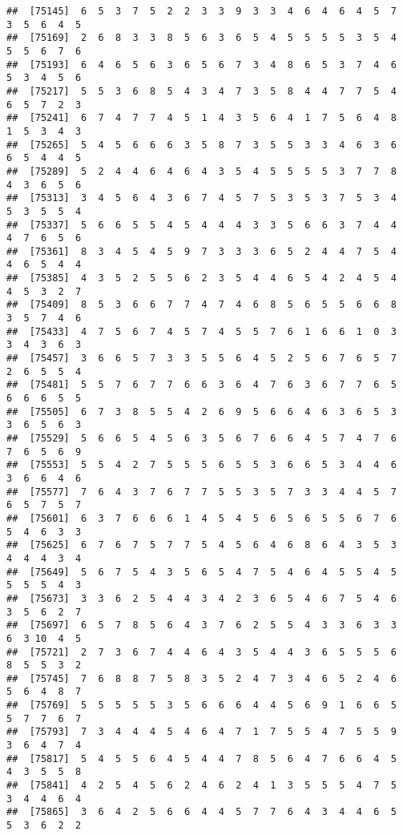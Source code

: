 \documentclass[
]{book}
\begin{document}
\begin{verbatim}
##  [75145]  6  5  3  7  5  2  2  3  3  9  3  3  4  6  4  6  4  5  7  3  5  6  4  5
##  [75169]  2  6  8  3  3  8  5  6  3  6  5  4  5  5  5  5  3  5  4  5  5  6  7  6
##  [75193]  6  4  6  5  6  3  6  5  6  7  3  4  8  6  5  3  7  4  6  5  3  4  5  6
##  [75217]  5  5  3  6  8  5  4  3  4  7  3  5  8  4  4  7  7  5  4  6  5  7  2  3
##  [75241]  6  7  4  7  7  4  5  1  4  3  5  6  4  1  7  5  6  4  8  1  5  3  4  3
##  [75265]  5  4  5  6  6  6  3  5  8  7  3  5  5  3  3  4  6  3  6  6  5  4  4  5
##  [75289]  5  2  4  4  6  4  6  4  3  5  4  5  5  5  5  3  7  7  8  4  3  6  5  6
##  [75313]  3  4  5  6  4  3  6  7  4  5  7  5  3  5  3  7  5  3  4  5  3  5  5  4
##  [75337]  5  6  6  5  5  4  5  4  4  4  3  3  5  6  6  3  7  4  4  4  7  6  5  6
##  [75361]  8  3  4  5  4  5  9  7  3  3  3  6  5  2  4  4  7  5  4  4  6  5  4  4
##  [75385]  4  3  5  2  5  5  6  2  3  5  4  4  6  5  4  2  4  5  4  4  5  3  2  7
##  [75409]  8  5  3  6  6  7  7  4  7  4  6  8  5  6  5  5  6  6  8  3  5  7  4  6
##  [75433]  4  7  5  6  7  4  5  7  4  5  5  7  6  1  6  6  1  0  3  3  4  3  6  3
##  [75457]  3  6  6  5  7  3  3  5  5  6  4  5  2  5  6  7  6  5  7  2  6  5  5  4
##  [75481]  5  5  7  6  7  7  6  6  3  6  4  7  6  3  6  7  7  6  5  6  6  6  5  5
##  [75505]  6  7  3  8  5  5  4  2  6  9  5  6  6  4  6  3  6  5  3  3  6  5  6  3
##  [75529]  5  6  6  5  4  5  6  3  5  6  7  6  6  4  5  7  4  7  6  7  6  5  6  9
##  [75553]  5  5  4  2  7  5  5  5  6  5  5  3  6  6  5  3  4  4  6  3  6  6  4  6
##  [75577]  7  6  4  3  7  6  7  7  5  5  3  5  7  3  3  4  4  5  7  6  5  7  5  7
##  [75601]  6  3  7  6  6  6  1  4  5  4  5  6  5  6  5  5  6  7  6  5  4  6  3  3
##  [75625]  6  7  6  7  5  7  7  5  4  5  6  4  6  8  6  4  3  5  3  4  4  4  3  4
##  [75649]  5  6  7  5  4  3  5  6  5  4  7  5  4  6  4  5  5  4  5  5  5  5  4  3
##  [75673]  3  3  6  2  5  4  4  3  4  2  3  6  5  4  6  7  5  4  6  3  5  6  2  7
##  [75697]  6  5  7  8  5  6  4  3  7  6  2  5  5  4  3  3  6  3  3  6  3 10  4  5
##  [75721]  2  7  3  6  7  4  4  6  4  3  5  4  4  3  6  5  5  5  6  8  5  5  3  2
##  [75745]  7  6  8  8  7  5  8  3  5  2  4  7  3  4  6  5  2  4  6  5  6  4  8  7
##  [75769]  5  5  5  5  5  3  5  6  6  6  4  4  5  6  9  1  6  6  5  5  7  7  6  7
##  [75793]  7  3  4  4  4  5  4  6  4  7  1  7  5  5  4  7  5  5  9  3  6  4  7  4
##  [75817]  5  4  5  5  6  4  5  4  4  7  8  5  6  4  7  6  6  4  5  4  3  5  5  8
##  [75841]  4  2  5  4  5  6  2  4  6  2  4  1  3  5  5  5  4  7  5  3  4  4  6  4
##  [75865]  3  6  4  2  5  6  6  4  4  5  7  7  6  4  3  4  4  6  5  5  3  6  2  2

\end{verbatim}
\end{document}
